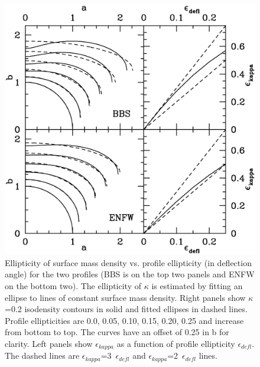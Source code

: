 \documentclass[useAMS,usenatbib]{mn2e}
\newcounter{two}   \setcounter{two}{2}
\begin{document}
\begin{figure}
  \centering \includegraphics[height=\columnwidth]{figs/ell.ps}
  \caption{ Ellipticity of surface mass density vs. profile
    ellipticity (in deflection angle) for the two profiles (BBS is on
    the top two panels and ENFW on the bottom two). The ellipticity of
    $\kappa$ is estimated by fitting an ellipse to lines of constant
    surface mass density. Right panels show $\kappa$=0.2 isodensity
    contours in solid and fitted ellipses in dashed lines. Profile
    ellipticities are {0.0, 0.05, 0.10, 0.15, 0.20, 0.25} and increase
    from bottom to top. The curves have an offset of 0.25 in b for
    clarity. Left panels show $\epsilon_{kappa}$ as a function of
    profile ellipticity $\epsilon_{defl}$. The dashed lines are
    $\epsilon_{kappa}$=3~$\epsilon_{defl}$ and
    $\epsilon_{kappa}$=2~$\epsilon_{defl}$ lines.  }
  \label{fig:ellipticity}
\end{figure}
\end{document}
